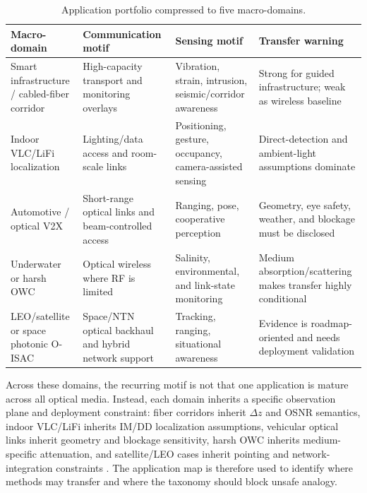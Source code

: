 \documentclass[letterpaper,journal]{IEEEtran}
\begin{document}
\begin{table}[!t]
    \caption{Application portfolio compressed to five macro-domains.}
    \label{tab:section7_portfolio}
    \centering
    \scriptsize
    \setlength{\tabcolsep}{2.8pt}
    \renewcommand{\arraystretch}{1.08}
    \begin{tabularx}{\textwidth}{@{}p{2.35cm}p{2.6cm}p{2.55cm}X@{}}
        \toprule
        Macro-domain & Communication motif & Sensing motif & Transfer warning \\
        \midrule
        Smart infrastructure / cabled-fiber corridor & High-capacity transport and monitoring overlays & Vibration, strain, intrusion, seismic/corridor awareness & Strong for guided infrastructure; weak as wireless baseline \\
        Indoor VLC/LiFi localization & Lighting/data access and room-scale links & Positioning, gesture, occupancy, camera-assisted sensing & Direct-detection and ambient-light assumptions dominate \\
        Automotive / optical V2X & Short-range optical links and beam-controlled access & Ranging, pose, cooperative perception & Geometry, eye safety, weather, and blockage must be disclosed \\
        Underwater or harsh OWC & Optical wireless where RF is limited & Salinity, environmental, and link-state monitoring & Medium absorption/scattering makes transfer highly conditional \\
        LEO/satellite or space photonic O-ISAC & Space/NTN optical backhaul and hybrid network support & Tracking, ranging, situational awareness & Evidence is roadmap-oriented and needs deployment validation \\
        \bottomrule
    \end{tabularx}
\end{table}

Across these domains, the recurring motif is not that one application is mature across all optical media. Instead, each domain inherits a specific observation plane and deployment constraint: fiber corridors inherit $\Delta z$ and OSNR semantics, indoor VLC/LiFi inherits IM/DD localization assumptions, vehicular optical links inherit geometry and blockage sensitivity, harsh OWC inherits medium-specific attenuation, and satellite/LEO cases inherit pointing and network-integration constraints \cite{O_ISAC_003,O_ISAC_005,O_ISAC_030,O_ISAC_059,O_ISAC_064}. The application map is therefore used to identify where methods may transfer and where the taxonomy should block unsafe analogy.
\end{document}
